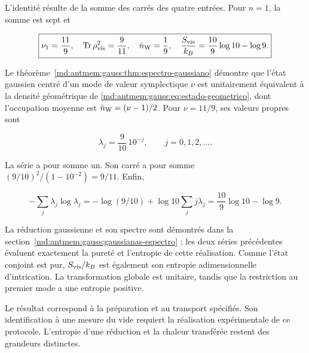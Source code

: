 L’identité résulte de la somme des carrés des quatre entrées. Pour \(n=1\), la somme est sept et

\begin{equation}
\boxed{\nu_1=\frac{11}{9},\quad
\operatorname{Tr}\rho_{\rm vis}^2=\frac9{11},\quad
\bar n_{\rm W}=\frac19,\quad
\frac{S_{\rm vis}}{k_B}=\frac{10}{9}\log10-\log9.}
\label{md:antmem:cuantica:eq:5.9}
\end{equation}

Le théorème~\ref{md:antmem:gauss:thm:espectro-gaussiano} démontre que l’état gaussien centré d’un mode de valeur symplectique \(\nu\) est unitairement équivalent à la densité géométrique de \eqref{md:antmem:gauss:eq:estado-geometrico}, dont l’occupation moyenne est \(\bar n_{\rm W}=(\nu-1)/2\). Pour \(\nu=11/9\), ses valeurs propres sont

\begin{equation}
\lambda_j=\frac9{10}\,10^{-j},\qquad j=0,1,2,\ldots.
\label{md:antmem:cuantica:eq:5.10}
\end{equation}

La série a pour somme un. Son carré a pour somme
\((9/10)^2/(1-10^{-2})=9/11\). Enfin,


\[
-\sum_j\lambda_j\log\lambda_j
=-\log(9/10)+\log10\sum_jj\lambda_j
=\frac{10}{9}\log10-\log9.
\]

La réduction gaussienne et son spectre sont démontrés dans la section~\ref{md:antmem:gauss:gaussianas-espectro} ; les deux séries précédentes évaluent exactement la pureté et l’entropie de cette réalisation. Comme l’état conjoint est pur, \(S_{\rm vis}/k_B\) est également son entropie adimensionnelle d’intrication. La transformation globale est unitaire, tandis que la restriction au premier mode a une entropie positive.

Le résultat correspond à la préparation et au transport spécifiés. Son identification à une mesure du vide requiert la réalisation expérimentale de ce protocole. L’entropie d’une réduction et la chaleur transférée restent des grandeurs distinctes.

